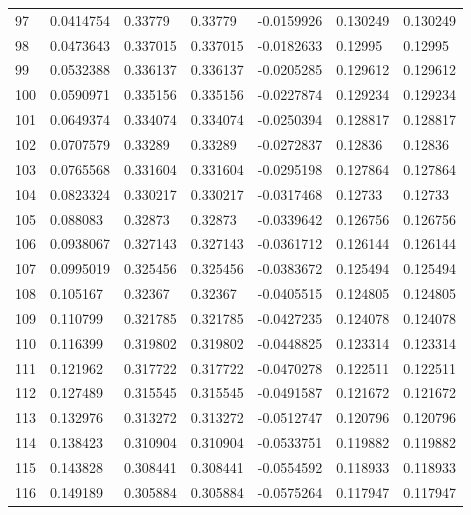 \begin{longtable}{l|lll|lll}
  97 &  0.0414754   & 0.33779     & 0.33779     & -0.0159926   & 0.130249    & 0.130249    \\
  98 &  0.0473643   & 0.337015    & 0.337015    & -0.0182633   & 0.12995     & 0.12995     \\
  99 &  0.0532388   & 0.336137    & 0.336137    & -0.0205285   & 0.129612    & 0.129612    \\
 100 &  0.0590971   & 0.335156    & 0.335156    & -0.0227874   & 0.129234    & 0.129234    \\
 101 &  0.0649374   & 0.334074    & 0.334074    & -0.0250394   & 0.128817    & 0.128817    \\
 102 &  0.0707579   & 0.33289     & 0.33289     & -0.0272837   & 0.12836     & 0.12836     \\
 103 &  0.0765568   & 0.331604    & 0.331604    & -0.0295198   & 0.127864    & 0.127864    \\
 104 &  0.0823324   & 0.330217    & 0.330217    & -0.0317468   & 0.12733     & 0.12733     \\
 105 &  0.088083    & 0.32873     & 0.32873     & -0.0339642   & 0.126756    & 0.126756    \\
 106 &  0.0938067   & 0.327143    & 0.327143    & -0.0361712   & 0.126144    & 0.126144    \\
 107 &  0.0995019   & 0.325456    & 0.325456    & -0.0383672   & 0.125494    & 0.125494    \\
 108 &  0.105167    & 0.32367     & 0.32367     & -0.0405515   & 0.124805    & 0.124805    \\
 109 &  0.110799    & 0.321785    & 0.321785    & -0.0427235   & 0.124078    & 0.124078    \\
 110 &  0.116399    & 0.319802    & 0.319802    & -0.0448825   & 0.123314    & 0.123314    \\
 111 &  0.121962    & 0.317722    & 0.317722    & -0.0470278   & 0.122511    & 0.122511    \\
 112 &  0.127489    & 0.315545    & 0.315545    & -0.0491587   & 0.121672    & 0.121672    \\
 113 &  0.132976    & 0.313272    & 0.313272    & -0.0512747   & 0.120796    & 0.120796    \\
 114 &  0.138423    & 0.310904    & 0.310904    & -0.0533751   & 0.119882    & 0.119882    \\
 115 &  0.143828    & 0.308441    & 0.308441    & -0.0554592   & 0.118933    & 0.118933    \\
 116 &  0.149189    & 0.305884    & 0.305884    & -0.0575264   & 0.117947    & 0.117947    \\

\end{longtable}
